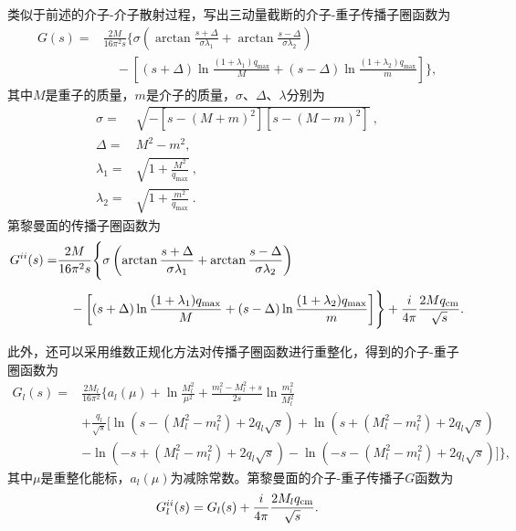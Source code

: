 类似于前述的介子-介子散射过程，写出三动量截断的介子-重子传播子圈函数为
\begin{equation}
	\label{eqcG}
\begin{split}
	G(s)=&\frac{2M}{16\pi^2s}\Biggl\{\sigma\left(\arctan\frac{s+\Delta}{\sigma\lambda_{1}}+\arctan\frac{s-\Delta}{\sigma\lambda_{2}}\right)\\[1ex]
	     &\quad-\left[(s+\Delta)\ln\frac{(1+\lambda_{1})q_{\text{max}}}{M}+(s-\Delta)\ln\frac{(1+\lambda_{2})q_{\text{max}}}{m}\right]\Biggr\},
\end{split}
\end{equation}
其中$M$是重子的质量，$m$是介子的质量，$\sigma$、$\Delta$、$\lambda$分别为
\begin{equation}
\begin{split}
	\sigma=&\sqrt{-[s-(M+m)^2][s-(M-m)^2]}\ ,\\[1ex]
	\Delta=&M^2-m^2,\\[1ex]
	\lambda_{1}=&\sqrt{1+\frac{M^2}{q_{\text{max}}}}\ ,\\[1ex]
	\lambda_{2}=&\sqrt{1+\frac{m^2}{q_{\text{max}}}}\ .
\end{split}
\end{equation}
第\uppercase\expandafter{}黎曼面的传播子圈函数为
\begin{equation}
	\label{eqcG2}
	\begin{aligned}
		G^{\uppercase\expandafter{\romannumeral2}}(s)=&\frac{2M}{16\pi^2s}\Biggl\{\sigma\left(\arctan\frac{s+\Delta}{\sigma\lambda_{1}}+\arctan\frac{s-\Delta}{\sigma\lambda_{2}}\right)\\[1ex]
							      &\quad-\left[(s+\Delta)\ln\frac{(1+\lambda_{1})q_{\text{max}}}{M}+(s-\Delta)\ln\frac{(1+\lambda_{2})q_{\text{max}}}{m}\right]\Biggr\}+\frac{i}{4\pi}\frac{2Mq_{\text{cm}}}{\sqrt{s}}.
	\end{aligned}
\end{equation}\par
此外，还可以采用维数正规化方法对传播子圈函数进行重整化，得到的介子-重子圈函数为\cite{JIDO2003181}
\begin{equation}
	\label{eqdG}
\begin{split}
	G_{l}(s)=&\frac{2M_{l}}{16\pi^2}\Big\{a_{l}(\mu)+\ln\frac{M_{l}^2}{\mu^2}+\frac{m_{l}^2-M_{l}^2+s}{2s}\ln\frac{m_{l}^2}{M_{l}^2}\\[1ex]
		 &+\frac{q_{l}}{\sqrt{s}}\big[\ln(s-(M_{l}^2-m_{l}^2)+2q_{l}\sqrt{s})+\ln(s+(M_{l}^2-m_{l}^2)+2q_{l}\sqrt{s})\\[1ex]
		 &-\ln(-s+(M_{l}^2-m_{l}^2)+2q_{l}\sqrt{s})-\ln(-s-(M_{l}^2-m_{l}^2)+2q_{l}\sqrt{s})\big]\Big\},
\end{split}
\end{equation}
其中$\mu$是重整化能标，$a_{l}(\mu)$为减除常数。第\uppercase\expandafter{}黎曼面的介子-重子传播子$G$函数为
\begin{equation}
	\label{eqdG2}
	G_{l}^{\uppercase\expandafter{\romannumeral2}}(s)=G_{l}(s)+\frac{i}{4\pi}\frac{2M_{l}q_{\text{cm}}}{\sqrt{s}}.
\end{equation}
